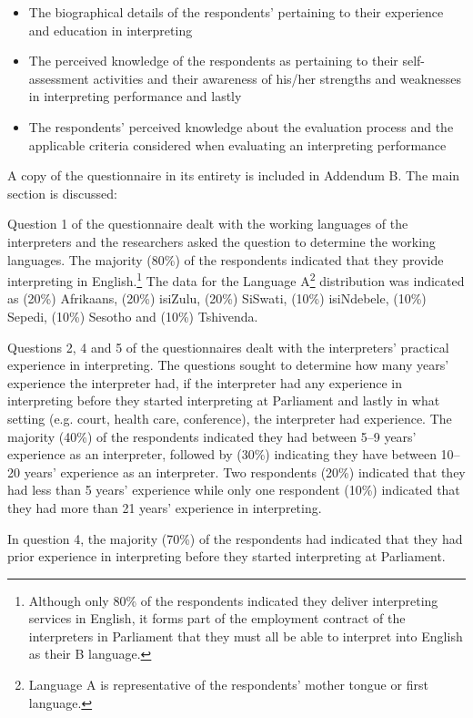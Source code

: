 \documentclass[output=paper]{langsci/langscibook}
\begin{document}
\begin{itemize}
\item The biographical details of the respondents’ pertaining to their experience and education in interpreting
\item The perceived knowledge of the respondents as pertaining to their self-assessment activities and their awareness of his/her strengths and weaknesses in interpreting performance and lastly
\item The respondents’ perceived knowledge about the evaluation process and the applicable criteria considered when evaluating an interpreting performance \end{itemize}

A copy of the questionnaire in its entirety is included in Addendum B. The main section is discussed:

Question 1 of the questionnaire dealt with the working languages of the interpreters and the researchers asked the question to determine the working languages. The majority (80\%) of the respondents indicated that they provide interpreting in English.\footnote{Although only 80\% of the respondents indicated they deliver interpreting services in English, it forms part of the employment contract of the interpreters in Parliament that they must all be able to interpret into English as their B language.} The data for the Language A\footnote{Language A is representative of the respondents’ mother tongue or first language.}  distribution was indicated as (20\%) Afrikaans, (20\%) isiZulu, (20\%) SiSwati, (10\%) isiNdebele, (10\%) Sepedi, (10\%) Sesotho and (10\%) Tshivenda. 

Questions 2, 4 and 5 of the questionnaires dealt with the interpreters’ practical experience in interpreting. The questions sought to determine how many years’ experience the interpreter had, if the interpreter had any experience in interpreting before they started interpreting at Parliament and lastly in what setting (e.g. court, health care, conference), the interpreter had experience. The majority (40\%) of the respondents indicated they had between 5--9 years’ experience as an interpreter, followed by (30\%) indicating they have between 10--20 years’ experience as an interpreter. Two respondents (20\%) indicated that they had less than 5 years’ experience while only one respondent (10\%) indicated that they had more than 21 years’ experience in interpreting.  

In question 4, the majority (70\%) of the respondents had indicated that they had prior experience in interpreting before they started interpreting at Parliament.  
\end{document}
